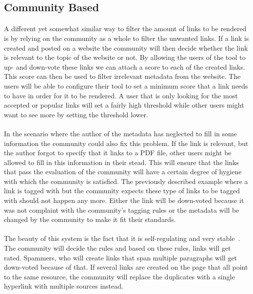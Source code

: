 	\subsection{Community Based} \label{ssub:Community Based}
		\paragraph{}
		A different yet somewhat similar way to filter the amount of links to be rendered is by relying on the community as a whole to filter the unwanted links. If a link is created and posted on a website the community will then decide whether the link is relevant to the topic of the website or not. By allowing the users of the tool to up- and down-vote these links we can attach a score to each of the created links. This score can then be used to filter irrelevant metadata from the website. The users will be able to configure their tool to set a minimum score that a link needs to have in order for it to be rendered. A user that is only looking for the most accepted or popular links will set a fairly high threshold while other users might want to see more by setting the threshold lower.
		\paragraph{}
		In the scenario where the author of the metadata has neglected to fill in some information the community could also fix this problem. If the link is relevant, but the author forgot to specify that it links to a PDF file, other users might be allowed to fill in this information in their stead. This will ensure that the links that pass the evaluation of the community will have a certain degree of hygiene with which the community is satisfied. The previously described example where a link is tagged with  but the community expects these type of links to be tagged with  should not happen any more. Either the link will be down-voted because it was not complaint with the community's tagging rules or the metadata will be changed by the community to make it fit their standards.
		\paragraph{}
		The beauty of this system is the fact that it is self-regulating and very stable~\cite{moore2008evaluating}. The community will decide the rules and based on these rules, links will get rated. Spammers, who will create links that span multiple paragraphs will get down-voted because of that. If several links are created on the page that all point to the same resource, the community will replace the duplicates with a single hyperlink with multiple sources instead.
